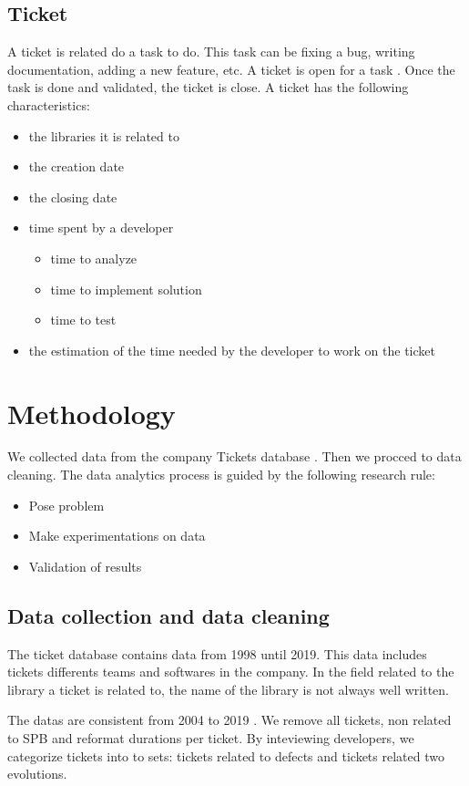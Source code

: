 \documentclass[10pt,conference]{IEEEtran}
\begin{document}
\subsection{Ticket}
A ticket is related do a task to do.  This task can be fixing a bug, writing documentation, adding a new feature, etc.  A ticket is open for a task . Once the task is done and validated, the ticket is close. A ticket has the following characteristics:
\begin{itemize}
\item the libraries it  is related to
\item the creation date
\item the closing date
\item time spent by a developer
\begin{itemize}
\item time to analyze
\item time to implement solution
\item time to test
\end{itemize}
\item  the estimation of the time needed by the developer to work on the ticket
\end{itemize}

\section{Methodology}\label{sec:methodology}
We collected data  from the company Tickets database .  Then we procced to data cleaning.
The data analytics process is guided by the following research rule:
\begin{itemize}
\item Pose problem
\item Make experimentations on data
\item Validation of results
\end{itemize}
\subsection{Data collection and data cleaning}
The ticket database contains data from 1998  until 2019.  This data includes tickets  differents teams and softwares in  the company. In the field related to the  library a ticket is related to,  the name of the library is not always well written. 

  The  datas are consistent  from 2004 to 2019 . We  remove all tickets, non related  to SPB and reformat durations per ticket. By inteviewing developers, we categorize tickets into to sets: tickets related to defects and tickets related two evolutions.
\end{document}
